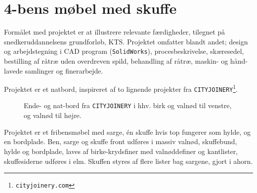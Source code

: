 \section*{4-bens møbel med skuffe}
Formålet med projektet er at illustrere relevante færdigheder, tilegnet på
snedkeruddannelsens grundforløb, KTS.
Projektet omfatter blandt andet; design og arbejdstegning i CAD program
(\texttt{SolidWorks}), procesbeskrivelse, skæresedel, bestilling af råtræ uden
overdreven spild, behandling af råtræ, maskin- og hånd-lavede samlinger og finerarbejde.

Projektet er et natbord, inspireret af to lignende projekter fra
\texttt{CITYJOINERY}\nolinebreak \footnote{\texttt{cityjoinery.com}}.

\begin{figure}[htb]
\centering
{}
\caption{Ende- og nat-bord fra \texttt{CITYJOINERY} i hhv. birk og valnød til
venstre, og valnød til højre.}
\end{figure}

Projektet er et fribensmøbel med sarge, én skuffe hvis top fungerer som hylde,
og en bordplade. Ben, sarge og skuffe front udføres i massiv valnød,
skuffebund, hylde og bordplade, laves af birke-krydsfiner med
valnøddefiner og kantlister, skuffesiderne udføres i elm. Skuffen styres af
flere lister bag sargene, gjort i ahorn.

